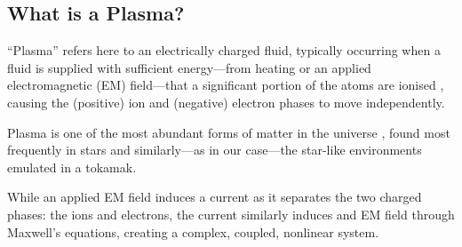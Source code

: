 \subsection*{What is a Plasma?}
    \line

    \begin{definition}[Plasma]
        ``Plasma'' refers here to an electrically charged fluid, typically occurring when a fluid is supplied with sufficient energy—from heating or an applied electromagnetic (EM) field—that a significant portion of the atoms  are ionised , causing the (positive) ion and (negative) electron phases to move independently.
    \end{definition}
    
    \line

    Plasma is one of the most abundant forms of matter in the universe \cite{CL13}, found most frequently in stars \cite{Phi95, Asc06, Pie17} and similarly—as in our case—the star-like environments emulated in a tokamak.
    
    While an applied EM field induces a current as it separates the two charged phases: the ions and electrons, the current similarly induces and EM field through Maxwell's equations, creating a complex, coupled, nonlinear system. \BA{[Ref.]}
    \begin{center}\end{center}
    